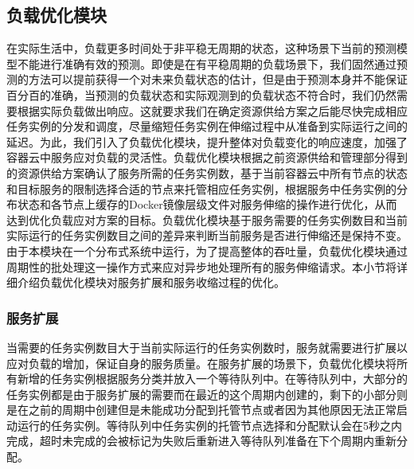 \subsection{负载优化模块}\label{sec:scheduler}
在实际生活中，负载更多时间处于非平稳无周期的状态，这种场景下当前的预测模型不能进行准确有效的预测。即使是在有平稳周期的负载场景下，我们固然通过预测的方法可以提前获得一个对未来负载状态的估计，但是由于预测本身并不能保证百分百的准确，当预测的负载状态和实际观测到的负载状态不符合时，我们仍然需要根据实际负载做出响应。这就要求我们在确定资源供给方案之后能尽快完成相应任务实例的分发和调度，尽量缩短任务实例在伸缩过程中从准备到实际运行之间的延迟。为此，我们引入了负载优化模块，提升整体对负载变化的响应速度，加强了容器云中服务应对负载的灵活性。负载优化模块根据之前资源供给和管理部分得到的资源供给方案确认了服务所需的任务实例数，基于当前容器云中所有节点的状态和目标服务的限制选择合适的节点来托管相应任务实例，根据服务中任务实例的分布状态和各节点上缓存的Docker镜像层级文件对服务伸缩的操作进行优化，从而达到优化负载应对方案的目标。负载优化模块基于服务需要的任务实例数目和当前实际运行的任务实例数目之间的差异来判断当前服务是否进行伸缩还是保持不变。由于本模块在一个分布式系统中运行，为了提高整体的吞吐量，负载优化模块通过周期性的批处理这一操作方式来应对异步地处理所有的服务伸缩请求。本小节将详细介绍负载优化模块对服务扩展和服务收缩过程的优化。

\subsubsection{服务扩展}\label{sec:scaleout}
当需要的任务实例数目大于当前实际运行的任务实例数时，服务就需要进行扩展以应对负载的增加，保证自身的服务质量。在服务扩展的场景下，负载优化模块将所有新增的任务实例根据服务分类并放入一个等待队列中。在等待队列中，大部分的任务实例都是由于服务扩展的需要而在最近的这个周期内创建的，剩下的小部分则是在之前的周期中创建但是未能成功分配到托管节点或者因为其他原因无法正常启动运行的任务实例。等待队列中任务实例的托管节点选择和分配默认会在5秒之内完成，超时未完成的会被标记为失败后重新进入等待队列准备在下个周期内重新分配。

